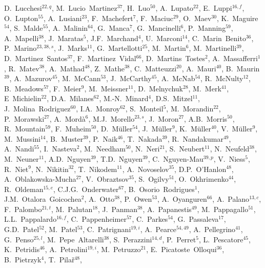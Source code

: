 \documentclass[12pt,a4paper]{article}
\begin{document}
\begin{flushleft}
D.~Lucchesi$^{22,q}$, 
M.~Lucio~Martinez$^{37}$, 
H.~Luo$^{50}$, 
A.~Lupato$^{22}$, 
E.~Luppi$^{16,f}$, 
O.~Lupton$^{55}$, 
A.~Lusiani$^{23}$, 
F.~Machefert$^{7}$, 
F.~Maciuc$^{29}$, 
O.~Maev$^{30}$, 
K.~Maguire$^{54}$, 
S.~Malde$^{55}$, 
A.~Malinin$^{64}$, 
G.~Manca$^{7}$, 
G.~Mancinelli$^{6}$, 
P.~Manning$^{59}$, 
A.~Mapelli$^{38}$, 
J.~Maratas$^{5}$, 
J.F.~Marchand$^{4}$, 
U.~Marconi$^{14}$, 
C.~Marin~Benito$^{36}$, 
P.~Marino$^{23,38,s}$, 
J.~Marks$^{11}$, 
G.~Martellotti$^{25}$, 
M.~Martin$^{6}$, 
M.~Martinelli$^{39}$, 
D.~Martinez~Santos$^{37}$, 
F.~Martinez~Vidal$^{66}$, 
D.~Martins~Tostes$^{2}$, 
A.~Massafferri$^{1}$, 
R.~Matev$^{38}$, 
A.~Mathad$^{48}$, 
Z.~Mathe$^{38}$, 
C.~Matteuzzi$^{20}$, 
A.~Mauri$^{40}$, 
B.~Maurin$^{39}$, 
A.~Mazurov$^{45}$, 
M.~McCann$^{53}$, 
J.~McCarthy$^{45}$, 
A.~McNab$^{54}$, 
R.~McNulty$^{12}$, 
B.~Meadows$^{57}$, 
F.~Meier$^{9}$, 
M.~Meissner$^{11}$, 
D.~Melnychuk$^{28}$, 
M.~Merk$^{41}$, 
E~Michielin$^{22}$, 
D.A.~Milanes$^{62}$, 
M.-N.~Minard$^{4}$, 
D.S.~Mitzel$^{11}$, 
J.~Molina~Rodriguez$^{60}$, 
I.A.~Monroy$^{62}$, 
S.~Monteil$^{5}$, 
M.~Morandin$^{22}$, 
P.~Morawski$^{27}$, 
A.~Mord\`{a}$^{6}$, 
M.J.~Morello$^{23,s}$, 
J.~Moron$^{27}$, 
A.B.~Morris$^{50}$, 
R.~Mountain$^{59}$, 
F.~Muheim$^{50}$, 
D.~M\"{u}ller$^{54}$, 
J.~M\"{u}ller$^{9}$, 
K.~M\"{u}ller$^{40}$, 
V.~M\"{u}ller$^{9}$, 
M.~Mussini$^{14}$, 
B.~Muster$^{39}$, 
P.~Naik$^{46}$, 
T.~Nakada$^{39}$, 
R.~Nandakumar$^{49}$, 
A.~Nandi$^{55}$, 
I.~Nasteva$^{2}$, 
M.~Needham$^{50}$, 
N.~Neri$^{21}$, 
S.~Neubert$^{11}$, 
N.~Neufeld$^{38}$, 
M.~Neuner$^{11}$, 
A.D.~Nguyen$^{39}$, 
T.D.~Nguyen$^{39}$, 
C.~Nguyen-Mau$^{39,p}$, 
V.~Niess$^{5}$, 
R.~Niet$^{9}$, 
N.~Nikitin$^{32}$, 
T.~Nikodem$^{11}$, 
A.~Novoselov$^{35}$, 
D.P.~O'Hanlon$^{48}$, 
A.~Oblakowska-Mucha$^{27}$, 
V.~Obraztsov$^{35}$, 
S.~Ogilvy$^{51}$, 
O.~Okhrimenko$^{44}$, 
R.~Oldeman$^{15,e}$, 
C.J.G.~Onderwater$^{67}$, 
B.~Osorio~Rodrigues$^{1}$, 
J.M.~Otalora~Goicochea$^{2}$, 
A.~Otto$^{38}$, 
P.~Owen$^{53}$, 
A.~Oyanguren$^{66}$, 
A.~Palano$^{13,c}$, 
F.~Palombo$^{21,t}$, 
M.~Palutan$^{18}$, 
J.~Panman$^{38}$, 
A.~Papanestis$^{49}$, 
M.~Pappagallo$^{51}$, 
L.L.~Pappalardo$^{16,f}$, 
C.~Pappenheimer$^{57}$, 
C.~Parkes$^{54}$, 
G.~Passaleva$^{17}$, 
G.D.~Patel$^{52}$, 
M.~Patel$^{53}$, 
C.~Patrignani$^{19,i}$, 
A.~Pearce$^{54,49}$, 
A.~Pellegrino$^{41}$, 
G.~Penso$^{25,l}$, 
M.~Pepe~Altarelli$^{38}$, 
S.~Perazzini$^{14,d}$, 
P.~Perret$^{5}$, 
L.~Pescatore$^{45}$, 
K.~Petridis$^{46}$, 
A.~Petrolini$^{19,i}$, 
M.~Petruzzo$^{21}$, 
E.~Picatoste~Olloqui$^{36}$, 
B.~Pietrzyk$^{4}$, 
T.~Pila\v{r}$^{48}$, 

\end{flushleft}
\end{document}
